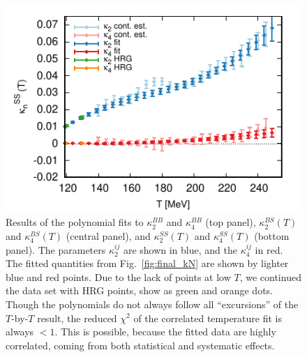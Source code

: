 \documentclass[aps,prd,twocolumn,superscriptaddress]{revtex4-2}
\begin{document}
\begin{figure}[!]
\includegraphics[width=\linewidth]{figures/fit_kappaNS2_paper.pdf}
\caption{Results of the polynomial fits to $\kappa_2^{BB}$ and 
$\kappa_4^{BB}$ (top panel),  $\kappa_2^{BS} (T)$ and $\kappa_4^{BS} (T)$
(central panel), and $\kappa_2^{SS} (T)$ and $\kappa_4^{SS} (T)$ (bottom
panel). The parameters $\kappa_2^{ij}$ are shown in blue, and the
$\kappa_4^{ij}$ in red. The fitted quantities from Fig.~\ref{fig:final_kN}
are shown by lighter blue and red 
points. Due to the lack of points at low $T$, we continued the data
set with HRG points, show as green and orange dots.
Though the polynomials do not always follow all ``excursions'' of the
$T$-by-$T$ result, the reduced $\chi^2$ of the correlated temperature
fit is always $<1$. This is possible, because the fitted data are highly
correlated, coming from both statistical and systematic effects.}
\label{fig:fits_kN}
\end{figure}


%
%
\end{document}
